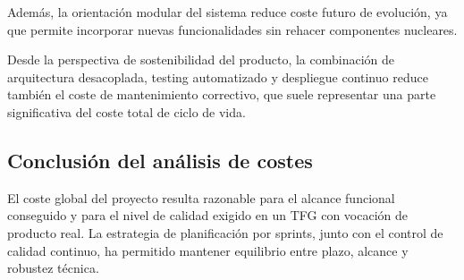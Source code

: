 Adem\'as, la orientaci\'on modular del sistema reduce coste futuro de evoluci\'on,
ya que permite incorporar nuevas funcionalidades sin rehacer componentes nucleares.

Desde la perspectiva de sostenibilidad del producto,
la combinaci\'on de arquitectura desacoplada,
testing automatizado y despliegue continuo
reduce tambi\'en el coste de mantenimiento correctivo,
que suele representar una parte significativa del coste total de ciclo de vida.

\subsection{Conclusi\'on del an\'alisis de costes}

El coste global del proyecto resulta razonable para el alcance funcional conseguido
y para el nivel de calidad exigido en un TFG con vocaci\'on de producto real.
La estrategia de planificaci\'on por sprints, junto con el control de calidad continuo,
ha permitido mantener equilibrio entre plazo, alcance y robustez t\'ecnica.

	
